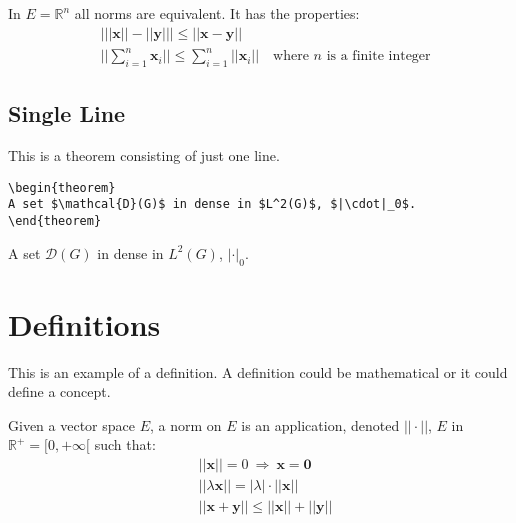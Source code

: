 \begin{theorem}
In $E=\mathbb{R}^n$ all norms are equivalent. It has the properties:
\begin{align}
& \big| ||\mathbf{x}|| - ||\mathbf{y}|| \big|\leq || \mathbf{x}- \mathbf{y}||\\
&  ||\sum_{i=1}^n\mathbf{x}_i||\leq \sum_{i=1}^n||\mathbf{x}_i||\quad\text{where $n$ is a finite integer}
\end{align}
\end{theorem}

\subsection{Single Line}
This is a theorem consisting of just one line.

\begin{verbatim}
\begin{theorem}
A set $\mathcal{D}(G)$ in dense in $L^2(G)$, $|\cdot|_0$. 
\end{theorem}
\end{verbatim}

\begin{theorem}
A set $\mathcal{D}(G)$ in dense in $L^2(G)$, $|\cdot|_0$. 
\end{theorem}


\section{Definitions}

This is an example of a definition. A definition could be mathematical or it could define a concept.

\begin{definition}
Given a vector space $E$, a norm on $E$ is an application, denoted $||\cdot||$, $E$ in $\mathbb{R}^+=[0,+\infty[$ such that:
\begin{align}
& ||\mathbf{x}||=0\ \Rightarrow\ \mathbf{x}=\mathbf{0}\\
& ||\lambda \mathbf{x}||=|\lambda|\cdot ||\mathbf{x}||\\
& ||\mathbf{x}+\mathbf{y}||\leq ||\mathbf{x}||+||\mathbf{y}||
\end{align}
\end{definition}


